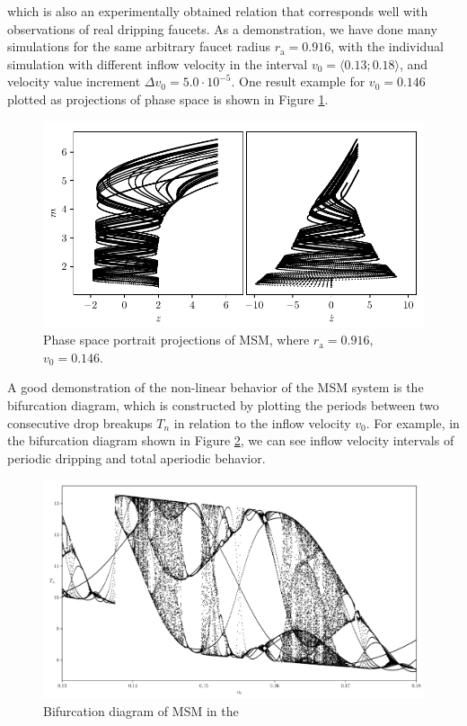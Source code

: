     which is also an experimentally obtained relation that corresponds well with observations of real dripping faucets. As a demonstration, we have done many simulations for the same arbitrary faucet radius $r_{\mathrm{a}} = 0.916$, with the individual simulation with different inflow velocity in the interval $v_0 = \langle 0.13; 0.18 \rangle$, and velocity value increment $\Delta v_0 = 5.0 \cdot 10^{-5}$. One result example for $v_0 = 0.146$ plotted as projections of phase space is shown in Figure \ref{fig:plot_msm_state_space}. 

    \begin{figure}[H]
    \begin{center}
        \includegraphics[width=1.0\columnwidth]{img/plot_msm_state_space.pdf}
    \end{center}
        \caption{Phase space portrait projections of MSM, where \mbox{$r_{\mathrm{a}} = 0.916$}, $v_0 = 0.146$.}
    \label{fig:plot_msm_state_space}
    \end{figure}

    A good demonstration of the non-linear behavior of the MSM system is the bifurcation diagram, which is constructed by plotting the periods between two consecutive drop breakups $T_n$ in relation to the inflow velocity $v_0$. For example, in the bifurcation diagram shown in Figure \ref{fig:plot_msm_bifurcation}, we can see inflow velocity intervals of periodic dripping and total aperiodic behavior. 

    \begin{figure}
        \includegraphics[width=1.0\columnwidth]{img/plot_msm_bifurcation.pdf}
        \caption{Bifurcation diagram of MSM in the }
        \label{fig:plot_msm_bifurcation}
    \end{figure}



